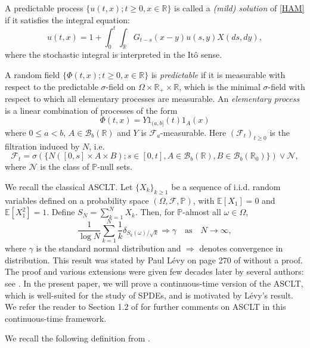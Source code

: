 \documentclass[12pt]{article}
\def\cB{\mathcal{B}}
\def\cF{\mathcal{F}}
\def\cN{\mathcal{N}}
\def\bE{\mathbb{E}}
\def\bP{\mathbb{P}}
\def\bR{\mathbb{R}}
\begin{document}
\medskip

A predictable process $\{u(t,x);t\geq 0,x\in \bR\}$ is called a {\em (mild) solution} of \eqref{HAM}
if it satisfies the integral equation:
\[
u(t,x)=1+\int_0^t \int_{\bR}G_{t-s}(x-y)u(s,y)X(ds,dy),
\]
where the stochastic integral is interpreted in the It\^o sense.

A random field $\{\Phi(t,x);t\geq 0,x\in \bR\}$ is {\em predictable} if it is measurable with respect to the predictable $\sigma$-field on $\Omega \times \bR_{+} \times \bR$, which is the minimal $\sigma$-field with respect to which all elementary processes are measurable. An {\em elementary process} is a linear combination of processes of the form
\[
\Phi(t,x)=Y 1_{(a,b]}(t) 1_{A}(x)
\]
where  $0\leq a<b$, $A \in \cB_b(\bR)$ and $Y$ is $\cF_a$-measurable. 
 Here $(\cF_t)_{t\geq 0}$ is the filtration induced by $N$, i.e.
\[
\cF_t=\sigma(\{N([0,s] \times A \times B); s \in [0,t],A\in \cB_b(\bR), B \in \cB_b(\bR_0)\}) \vee \cN,
\]
where $\cN$ is the class of $\bP$-null sets.

\medskip

We recall the classical ASCLT. Let $\{X_k\}_{k\geq 1}$ be a sequence of i.i.d. random variables defined on a probability space $(\Omega,\cF,\bP)$, with $\bE[X_1]=0$ and $\bE[X_1^2]=1$. Define $S_N=\sum_{k=1}^{N}X_k$. Then, for $\bP$-almost all $\omega \in \Omega$,
\[
\frac{1}{\log N}\sum_{k=1}^{N}\frac{1}{k}\delta_{S_k(\omega)/\sqrt{k}} \Longrightarrow \gamma \quad \mbox{as}  \quad N \to \infty,
\]
where $\gamma$ is the standard normal distribution and $\Longrightarrow$ denotes convergence in distribution. This result was stated by Paul L\'evy on page 270 of \cite{levy54} without a proof. The proof and various extensions were given few decades later by several authors: see \cite{brosamler88,lacey-philipp90,schatte88}. 
In the present paper, we will prove a continuous-time version of the ASCLT, which is well-suited for the study of SPDEs, and is motivated by L\'evy's result. We refer the reader to Section 1.2 of \cite{BXZ} for further comments on ASCLT in this continuous-time framework.

\medskip

We recall the following definition from \cite{BXZ}. 
\end{document}
